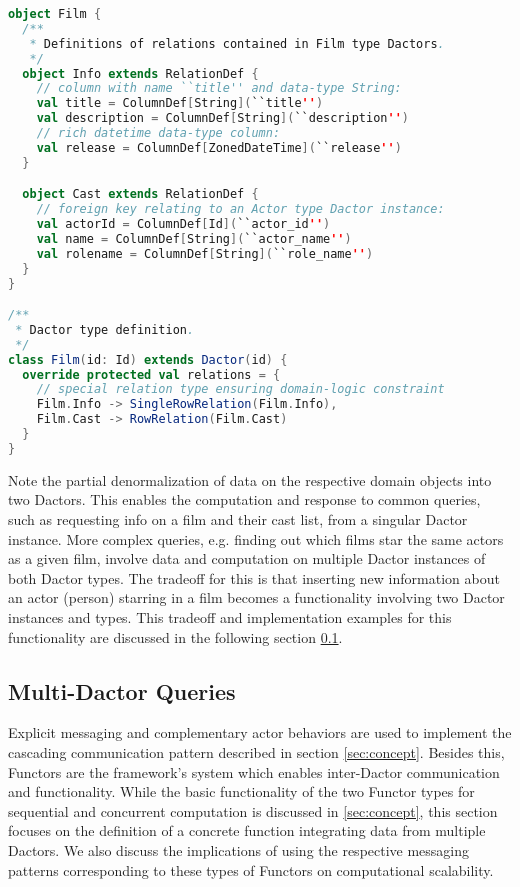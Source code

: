 \begin{lstlisting}[caption=Film Dactor type definition using the actordb framework, label=lst:film_definition, language=Scala]
object Film {
  /**
   * Definitions of relations contained in Film type Dactors.
   */
  object Info extends RelationDef {
    // column with name ``title'' and data-type String:
    val title = ColumnDef[String](``title'')
    val description = ColumnDef[String](``description'')
    // rich datetime data-type column:
    val release = ColumnDef[ZonedDateTime](``release'')
  }

  object Cast extends RelationDef {
    // foreign key relating to an Actor type Dactor instance:
    val actorId = ColumnDef[Id](``actor_id'')
    val name = ColumnDef[String](``actor_name'')
    val rolename = ColumnDef[String](``role_name'')
  }
} 

/**
 * Dactor type definition.
 */
class Film(id: Id) extends Dactor(id) {
  override protected val relations = {
    // special relation type ensuring domain-logic constraint
    Film.Info -> SingleRowRelation(Film.Info),
    Film.Cast -> RowRelation(Film.Cast)
  }
}
\end{lstlisting}

%

Note the partial denormalization of data on the respective domain objects into two Dactors.
This enables the computation and response to common queries, such as requesting info on a film and their cast list, from a singular Dactor instance.
More complex queries, e.g. finding out which films star the same actors as a given film, involve data and computation on multiple Dactor instances of both Dactor types.
The tradeoff for this is that inserting new information about an actor (person) starring in a film becomes a functionality involving two Dactor instances and types.
This tradeoff and implementation examples for this functionality are discussed in the following section \ref{subsec:multi_dactor_queries}.


\subsection{Multi-Dactor Queries}\label{subsec:multi_dactor_queries}

Explicit messaging and complementary actor behaviors are used to implement the cascading communication pattern described in section \ref{sec:concept}.
Besides this, Functors are the framework's system which enables inter-Dactor communication and functionality.
While the basic functionality of the two Functor types for sequential and concurrent computation is discussed in \ref{sec:concept}, this section focuses on the definition of a concrete function integrating data from multiple Dactors.
We also discuss the implications of using the respective messaging patterns corresponding to these types of Functors on computational scalability.

